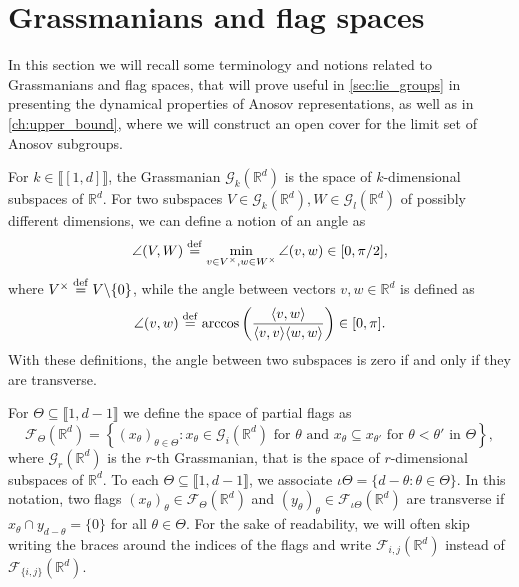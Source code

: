 \documentclass{report}
\begin{document}
\section{Grassmanians and flag spaces}
In this section we will recall some terminology and notions related to Grassmanians and flag spaces, that will prove useful in \cref{sec:lie_groups} in presenting the dynamical properties of Anosov representations, as well as in \cref{ch:upper_bound}, where we will construct an open cover for the limit set of Anosov subgroups.

For $k \in \llbracket [1, d] \rrbracket$, the Grassmanian $\mathcal G_k(\mathbb R^d)$ is the space of $k$-dimensional subspaces of $\mathbb R^d$.
For two subspaces $V \in \mathcal G_k(\mathbb R^d), W \in \mathcal G_l(\mathbb R^d)$ of possibly different dimensions, we can define a notion of an angle as
\[
\angle (V, W) \overset{\mathrm{def}}{=} \min_{v \in V^\times, w \in W^\times} \angle(v,w) \in [0, \pi/2],
\]
where $V^\times \overset{\mathrm{def}}{=} V \backslash \{0\}$, while the angle between vectors $v, w \in \mathbb R^d$ is defined as
\[
\angle(v,w) \overset{\mathrm{def}}{=} \arccos \left( \frac{\langle v,w \rangle}{\langle v, v \rangle \langle w, w \rangle} \right) \in [0, \pi].
\]
With these definitions, the angle between two subspaces is zero if and only if they are transverse.

For $\Theta \subseteq \llbracket 1, d - 1\rrbracket$ we define the space of partial flags as
$$\mathcal F_\Theta(\mathbb R^d) = \left\{ (x_\theta)_{\theta \in \Theta} : x_\theta \in \mathcal G_i(\mathbb R^d) \text{ for } \theta \text{ and } x_{\theta} \subseteq x_{\theta'} \text{ for } \theta < \theta' \text{ in } \Theta \right\}, $$
where $\mathcal G_r(\mathbb R^d)$ is the $r$-th Grassmanian, that is the space of $r$-dimensional subspaces of $\mathbb R^d$.
To each $\Theta \subseteq \llbracket 1, d -1 \rrbracket$, we associate $\iota \Theta = \{ d - \theta : \theta \in \Theta \}$. 
In this notation, two flags $(x_\theta)_\theta \in \mathcal F_\Theta(\mathbb R^d)$ and $(y_{\theta})_\theta \in \mathcal F_{\iota \Theta}(\mathbb R^d)$ are transverse if $x_\theta \cap y_{d-\theta} = \{0\}$ for all $\theta \in \Theta$.
For the sake of readability, we will often skip writing the braces around the indices of the flags and write $\mathcal F_{i,j}(\mathbb R^d)$ instead of $\mathcal F_{\{i,j\}}(\mathbb R^d)$.
\end{document}
